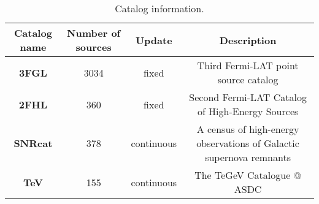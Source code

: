 \begin{table}[h]

\caption{Catalog information.}
\label{tab:a}
\begin{tabular}{ || c|ccc ||}
\hline


\textbf{Catalog name} & \textbf{Number of sources} & \textbf{Update} & \textbf{Description} \\ \hline
\textbf{3FGL} & 3034 & fixed & Third Fermi-LAT point source catalog\\
\textbf{2FHL} & 360 & fixed & Second Fermi-LAT Catalog of High-Energy Sources\\
\textbf{SNRcat} & 378 & continuous & A census of high-energy observations of Galactic supernova remnants\\
\textbf{TeV} & 155 & continuous & The TeGeV Catalogue @ ASDC\\
\hline
\end{tabular}
\end{table}
